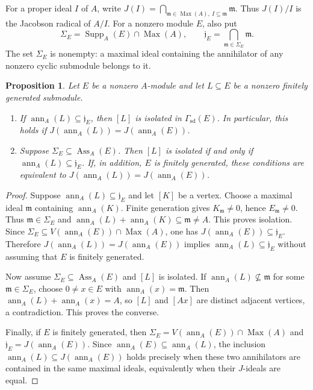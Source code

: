 \documentclass[11pt]{amsart}
\theoremstyle{plain}
\newtheorem{proposition}[theorem]{Proposition}
\theoremstyle{definition}
\theoremstyle{remark}
\DeclareMathOperator{\Supp}{Supp}
\DeclareMathOperator{\Ass}{Ass}
\DeclareMathOperator{\Max}{Max}
\newcommand{\ann}{\operatorname{ann}}
\newcommand{\GammaSD}{\Gamma_{\mathrm{sd}}}
\numberwithin{equation}{section}
\begin{document}
For a proper ideal $I$ of $A$, write
$J(I)=\bigcap_{\mathfrak m\in\Max(A),\ I\subseteq\mathfrak m}\mathfrak m$.
Thus $J(I)/I$ is the Jacobson radical of $A/I$.
For a nonzero module $E$, also put
\[
\Sigma_E=\Supp_A(E)\cap\Max(A),\qquad
\mathfrak j_E=\bigcap_{\mathfrak m\in\Sigma_E}\mathfrak m.
\]
The set $\Sigma_E$ is nonempty: a maximal ideal containing the annihilator
of any nonzero cyclic submodule belongs to it.

\begin{proposition}\label{prop:graph-isolated}\label{pisolated}
Let $E$ be a nonzero $A$-module and let $L\subseteq E$ be a nonzero finitely
generated submodule.
\begin{enumerate}[label=\textup{(\roman*)}]
\item If $\ann_A(L)\subseteq\mathfrak j_E$, then $[L]$ is isolated in
$\GammaSD(E)$. In particular, this holds if
$J(\ann_A(L))=J(\ann_A(E))$.
\item Suppose $\Sigma_E\subseteq\Ass_A(E)$. Then $[L]$ is isolated if and
only if $\ann_A(L)\subseteq\mathfrak j_E$.
If, in addition, $E$ is finitely generated, these conditions are equivalent
to $J(\ann_A(L))=J(\ann_A(E))$.
\end{enumerate}
\end{proposition}

\begin{proof}
Suppose $\ann_A(L)\subseteq\mathfrak j_E$ and let $[K]$ be a vertex.
Choose a maximal ideal $\mathfrak m$ containing $\ann_A(K)$.
Finite generation gives $K_{\mathfrak m}\ne0$, hence $E_{\mathfrak m}\ne0$.
Thus $\mathfrak m\in\Sigma_E$ and
$\ann_A(L)+\ann_A(K)\subseteq\mathfrak m\ne A$.
This proves isolation. Since
$\Sigma_E\subseteq V(\ann_A(E))\cap\Max(A)$, one has
$J(\ann_A(E))\subseteq\mathfrak j_E$.
Therefore $J(\ann_A(L))=J(\ann_A(E))$ implies
$\ann_A(L)\subseteq\mathfrak j_E$ without assuming that $E$ is finitely
generated.

Now assume $\Sigma_E\subseteq\Ass_A(E)$ and $[L]$ is isolated.
If $\ann_A(L)\not\subseteq\mathfrak m$ for some $\mathfrak m\in\Sigma_E$,
choose $0\ne x\in E$ with $\ann_A(x)=\mathfrak m$.
Then $\ann_A(L)+\ann_A(x)=A$, so $[L]$ and $[Ax]$ are distinct adjacent
vertices, a contradiction. This proves the converse.

Finally, if $E$ is finitely generated, then
$\Sigma_E=V(\ann_A(E))\cap\Max(A)$ and
$\mathfrak j_E=J(\ann_A(E))$.
Since $\ann_A(E)\subseteq\ann_A(L)$, the inclusion
$\ann_A(L)\subseteq J(\ann_A(E))$ holds precisely when these two
annihilators are contained in the same maximal ideals, equivalently when
their $J$-ideals are equal.
\end{proof}
\end{document}
